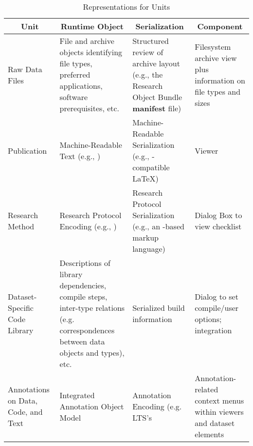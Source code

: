 \begin{table}
\renewcommand{\arraystretch}{2}
\label{tab:sdrm}
\begin{scriptsize}
\begin{center}
\begin{tabular}{|p{}|p{}|p{}|p{}|}
\multicolumn{1}{c}{\textbf{\sSDRM{} Unit}} &%
\multicolumn{1}{c}{\textbf{Runtime Object}} &%
\multicolumn{1}{c}{\textbf{Serialization}} &%
\multicolumn{1}{c}{\textbf{\sGUI{} Component}} \\%
\midrule
\RaggedRight{}Raw Data Files &\RaggedRight{} File and archive objects identifying file types, 
preferred applications, software prerequisites, etc. 
&\RaggedRight{} Structured review of archive layout (e.g., the Research Object 
Bundle \textbf{manifest} file) 
&\RaggedRight{} Filesystem archive view plus information on file types and sizes  \\%
Publication &\RaggedRight{} Machine-Readable Text (e.g., \sHTXN{}) 
&\RaggedRight{}  
Machine-Readable Serialization (e.g., \sHTXN{}-compatible \LaTeX{}) 
&\RaggedRight{} \sPDF{} Viewer  \\%
\RaggedRight{}Research Method &\RaggedRight{} Research Protocol Encoding (e.g., \sBioCoder{}) 
&\RaggedRight{} Research Protocol Serialization (e.g., an \sMIBBI{}-based markup language) 
&\RaggedRight{} Dialog Box to view \q{Minimum Information} checklist   \\
\midrule
\RaggedRight{}Dataset-Specific Code Library &\RaggedRight{} Descriptions of library dependencies, compile 
steps, inter-type relations (e.g. correspondences between data objects and 
\sGUI{} types), etc. 
&\RaggedRight{} Serialized build information  
&\RaggedRight{} Dialog to set compile/user options; \sIDE{} integration  \\
\midrule
\RaggedRight{}Annotations on Data, Code, and Text &\RaggedRight{} Integrated Annotation Object 
Model &\RaggedRight{} Annotation Encoding (e.g. LTS's \q{Annotation Exchange Format}   
&\RaggedRight{} Annotation-related context menus within \sPDF{} viewers and 
dataset \sGUI{} elements 
\bottomrule
\end{tabular}
\end{center}
\end{scriptsize}
\caption{Representations for \SDRM{} Units}
\end{table}
 

